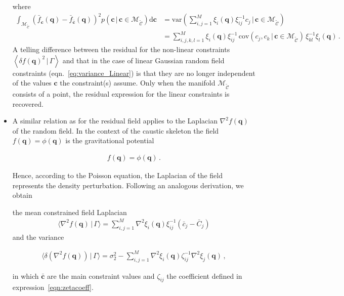 \documentclass[a4paper, 11pt]{article}
\begin{document}
\begin{itemize}
where
\begin{align}
\int_{\mathcal{M}_\mathcal{\tilde C}} (\bar{f}_{\bm{c}}(\bm{q})- \bar{f}_{\bar{\bm{c}}}(\bm{q}))^2p(\bm{c}\,|\,\bm{c}\in\mathcal{M}_{\mathcal{\tilde C}})\mathrm{d}\bm{c} 
&= \text{var}\left(\sum_{i,j=1}^M\xi_i(\bm{q})\xi_{ij}^{-1}c_j\,|\,\bm{c}\in \mathcal{M}_\mathcal{\tilde C}\right)\\
&=\sum_{i,j,k,l=1}^M \xi_i(\bm{q})\xi_{ij}^{-1}\,\text{cov}(c_j,c_k\,|\,\bm{c}\in\mathcal{M}_\mathcal{\tilde C})\,\xi_{kl}^{-1}\xi_l(\bm{q})\,.\nonumber
\end{align}
A telling difference between the residual for the non-linear constraints $\left \langle \delta f (\bm{q})^2\,|\,\Gamma\right\rangle$ and that in the case of linear Gaussian random field constraints (eqn.~\ref{eq:variance_Linear}) is that they are no longer independent of the values $\bm{c}$ the constraint(s) assume. Only when the manifold $\mathcal{M}_\mathcal{\tilde C}$ consists of a point, the residual expression for the linear constraints is recovered. 


\item
A similar relation as for the residual field applies to the Laplacian $\nabla^2 f(\bm{q})$ of the random field. In the context of the caustic skeleton the field $f({\bm q})=\phi({\bm q})$ is the gravitational potential

\begin{align}
f({\bm q})=\phi({\bm q})\,.
\end{align}

Hence, according to the Poisson equation, the Laplacian of the field represents the density perturbation. Following an analogous derivation, we obtain 

\begin{framed}
the mean constrained field Laplacian  
\begin{align}
\langle \nabla^2 f(\bm{q})\,|\,\Gamma\rangle = \sum_{i,j=1}^M \nabla^2\xi_i(\bm{q})\xi_{ij}^{-1}(\bar{c}_j-\bar{C}_j)
\end{align}
and the variance

\begin{align}
\langle \delta (\nabla^2 f(\bm{q}))\,|\,\Gamma\rangle = \sigma_2^2 - \sum_{i,j=1}^M \nabla^2 \xi_i(\bm{q})\zeta_{ij}^{-1}\nabla^2\xi_j(\bm{q})\,,
\end{align}
\end{framed}
in which $\bar{\bm{c}}$ are the main constraint values and $\zeta_{ij}$ the coefficient defined in expression~\ref{eqn:zetacoeff}.
\end{itemize}
\end{document}
